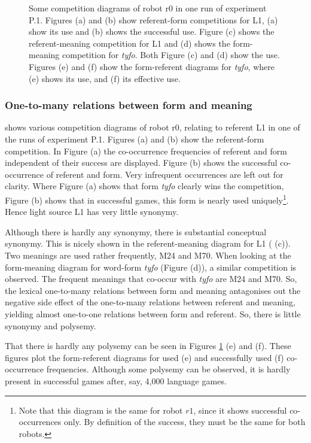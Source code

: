 \begin{figure}
\caption{Some competition diagrams of robot r0 in one run of experiment P.1. Figures (a) and (b) show referent-form competitions for L1, (a) show its use and (b) shows the successful use. Figure (c) shows the referent-meaning competition for L1 and (d) shows the form-meaning competition for {\it tyfo}. Both Figure (c) and (d) show the use. Figures (e) and (f) show the form-referent diagrams for {\it tyfo}, where (e) shows its use, and (f) its effective use.}
\label{f:opt:ggcomp1}
\end{figure}

\subsubsection{One-to-many relations between form and meaning}

 shows various competition diagrams of robot r0, relating to referent L1 in one of the runs of experiment P.1. Figures (a) and (b) show the referent-form competition. In Figure (a) the co-occurrence frequencies of referent and form independent of their success are displayed. Figure (b) shows the successful co-occurrence of referent and form. Very infrequent occurrences are left out for clarity. Where Figure (a) shows that form {\it tyfo} clearly wins the competition, Figure (b) shows that  in successful games, this form is nearly used uniquely\footnote{Note that this diagram is the same for robot $r1$, since it shows successful co-occurrences only. By definition of the success, they must be the same for both robots.}. Hence light source L1 has very little synonymy. 

Although there is hardly any synonymy, there is substantial conceptual synonymy. This is nicely shown in the referent-meaning diagram for L1 ( (c)). Two meanings are used rather frequently, M24 and M70. When looking at the form-meaning diagram for word-form {\it tyfo} (Figure (d)), a similar competition is observed. The frequent meanings that co-occur with {\it tyfo} are M24 and M70. So, the lexical one-to-many relations between form and meaning antagonises out the negative side effect of the one-to-many relations between referent and meaning, yielding almost one-to-one relations between form and referent. So, there is little synonymy and polysemy. 

That there is hardly any polysemy can be seen in Figures \ref{f:opt:ggcomp1} (e) and (f). These figures plot the form-referent diagrams for used (e) and successfully used (f) co-occurrence frequencies. Although some polysemy can be observed, it is hardly present in successful games after, say, 4,000 language games.


